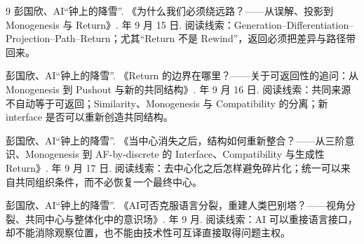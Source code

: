 \documentclass[UTF8,zihao=-4,fontset=none,oneside,openany]{ctexbook}
\begin{document}
\begin{thebibliography}{9}
彭国欣、AI“钟上的降雪”.
\newblock 《为什么我们必须绕远路？——从误解、投影到 Monogenesis 与 Return》.
 年 9 月 15 日.
\newblock 阅读线索：Generation--Differentiation--Projection--Path--Return；尤其“Return 不是 Rewind”，返回必须把差异与路径带回来。

彭国欣、AI“钟上的降雪”.
\newblock 《Return 的边界在哪里？——关于可返回性的追问：从 Monogenesis 到 Pushout 与新的共同结构》.
 年 9 月 16 日.
\newblock 阅读线索：共同来源不自动等于可返回；Similarity、Monogenesis 与 Compatibility 的分离；新 interface 是否可以重新创造共同结构。

彭国欣、AI“钟上的降雪”.
\newblock 《当中心消失之后，结构如何重新整合？——从三阶意识、Monogenesis 到 AF-by-discrete 的 Interface、Compatibility 与生成性 Return》.
 年 9 月 17 日.
\newblock 阅读线索：去中心化之后怎样避免碎片化；统一可以来自共同组织条件，而不必恢复一个最终中心。

彭国欣、AI“钟上的降雪”.
\newblock 《AI可否克服语言分裂，重建人类巴别塔？——视角分裂、共同中心与整体化中的意识场》.
 年 9 月.
\newblock 阅读线索：AI 可以重接语言接口，却不能消除观察位置，也不能由技术性可互译直接取得问题主权。

\end{thebibliography}
\end{document}
